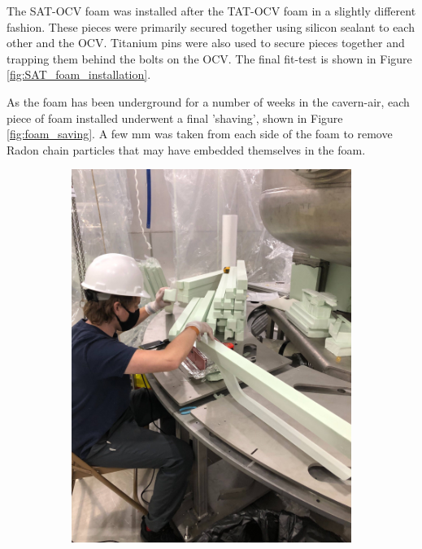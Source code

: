 \par
The SAT-OCV foam was installed after the TAT-OCV foam in a slightly different fashion.
These pieces were primarily secured together using silicon sealant to each other and the OCV.
Titanium pins were also used to secure pieces together and trapping them behind the bolts on the OCV.
The final fit-test is shown in Figure \ref{fig:SAT_foam_installation}.

\par
As the foam has been underground for a number of weeks in the cavern-air, each piece of foam installed underwent a final 'shaving', shown in Figure \ref{fig:foam_saving}.
A few mm was taken from each side of the foam to remove Radon chain particles that may have embedded themselves in the foam.

\begin{figure}[!htbp]
  \begin{subfigure}{.5\textwidth}
  \centering
  \includegraphics[width=\linewidth]{Figures/Construction/foam_shaving.jpg}

\end{subfigure}
\end{figure}
